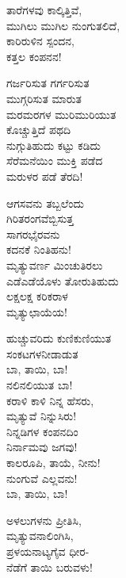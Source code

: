 \begin{myquote}
ತಾರೆಗಳವು ಕಾಲ್ಕಿತ್ತಿವೆ,\\ಮುಗಿಲು ಮುಗಿಲ ನುಂಗುತಲಿದೆ,\\ಕಾರಿರುಳಿನ ಸ್ಪಂದನ,\\ಕತ್ತಲ ಕಂಪನನ!
\end{myquote}

\begin{myquote}
ಗರ್ಜರಿಸುತ ಗರ್ಗರಿಸುತ\\ಮುಗ್ಗರಿಸುತ ಮಾರುತ\\ಮರಮರಗಳ ಮುರಿಮುರಿಯುತ\\ಕೊಚ್ಚುತ್ತಿದೆ ಪಥದಿ\\ನುಗ್ಗುತಿಹುದು ಕಟ್ಟು ಕಡಿದು\\ಸೆರೆಮನೆಯಿಂ ಮುಕ್ತಿ ಪಡೆದ\\ಮರುಳರ ಪಡೆ ತೆರದಿ!
\end{myquote}

\begin{myquote}
ಆಗಸವನು ತಬ್ಬಲೆಂದು\\ಗಿರಿತರಂಗವೆಬ್ಬಿಸುತ್ತ\\ಸಾಗರಭೈರವನು\\ಕದನಕೆ ನಿಂತಿಹನು!\\ಮೃತ್ಯುವರ್ಣ ಮಿಂಚುತಿರಲು\\ಎಡೆಎಡೆಯೊಳು ತೋರುತಿಹುದು\\ಲಕ್ಷಲಕ್ಷ ಕರಿಕರಾಳ\\ಮೃತ್ಯುಛಾಯೆಯ!
\end{myquote}

\begin{myquote}
ಹುಚ್ಚುವರಿದು ಕುಣಿಕುಣಿಯುತ\\ಸಂಕಟಗಳನೀಡಾಡುತ\\ಬಾ, ತಾಯಿ, ಬಾ!\\ನಲಿನಲಿಯುತ ಬಾ!\\ಕರಾಳಿ ಕಾಳಿ ನಿನ್ನ ಹೆಸರು,\\ಮೃತ್ಯುವೆ ನಿನ್ನುಸಿರು!\\ನಿನ್ನಡಿಗಳ ಕಂಪನದಿಂ\\ನಿರ್ನಾಮವು ಜಗವು!\\ಕಾಲರೂಪಿ, ತಾಯೆ, ನೀನು!\\ನುಂಗುವೆ ಎಲ್ಲವನು!\\ಬಾ, ತಾಯಿ, ಬಾ!
\end{myquote}

\delimiter

\begin{myquote}
ಅಳಲುಗಳನು ಪ್ರೀತಿಸಿ,\\ಮೃತ್ಯುವನಾಲಿಂಗಿಸಿ,\\ಪ್ರಳಯನಾಟ್ಯಗೈವ ಧೀರ-\\ನೆಡೆಗೆ ತಾಯಿ ಬರುವಳು!
\end{myquote}

